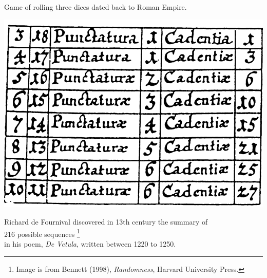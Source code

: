\documentclass[9pt]{beamer}
\begin{document}
\begin{frame}[fragile,t] %

 \begin{center}
   Game of rolling three dices dated back to Roman Empire.
   \bigskip
   \bigskip

   \includegraphics[scale=0.25]{./figs/216cases.png}
   \bigskip

   Richard de Fournival discovered in 13th century the summary of                                              \\
   216 possible sequences \footnote{Image is from Bennett (1998), {\it Randomness}, Harvard University Press.} \\
   in his poem, \textit{\it De Vetula}, written between 1220 to 1250.


 \end{center}

\end{frame}
\end{document}

